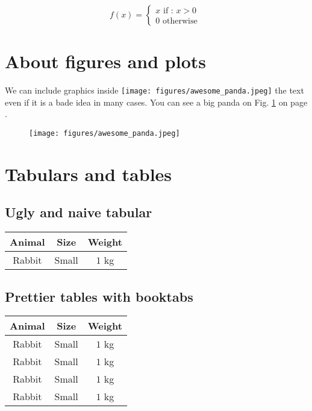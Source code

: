 \documentclass[10pt,a4paper]{article}
\begin{document}
\begin{equation}
    f(x) =
    \left\lbrace
    \begin{split}
        x \mbox{ if : } x > 0 \\
        0 \mbox { otherwise }
    \end{split}
    \right.
\end{equation}

\section{About figures and plots}

\blindtext[1]
We can include graphics inside
\texttt{[image: figures/awesome\_panda.jpeg]}
the text even if it is a bade idea in many cases.
\blindtext[1]
You can see a big panda on Fig. \ref{fig:panda} on page \pageref{fig:panda}.

\begin{figure}
    \begin{center}
        \texttt{[image: figures/awesome\_panda.jpeg]}
    \end{center}
    \caption{\blindtext[1]}
    \label{fig:panda}
\end{figure}

\section{Tabulars and tables}

\subsection{Ugly and naive tabular}

\begin{tabular}{|c|c|c|}
    \hline
    \textbf{Animal} & \textbf{Size} & \textbf{Weight} \\
    \hline
    Rabbit          & Small         & $1$ kg          \\
    \hline
\end{tabular}

\subsection{Prettier tables with booktabs}


\begin{tabular}{ccc}
    \toprule
    \textbf{Animal} & \textbf{Size} & \textbf{Weight} \\
    \midrule
    Rabbit          & Small         & $1$ kg          \\
    Rabbit          & Small         & $1$ kg          \\
    Rabbit          & Small         & $1$ kg          \\
    Rabbit          & Small         & $1$ kg          \\
    \bottomrule
\end{tabular}
\end{document}
